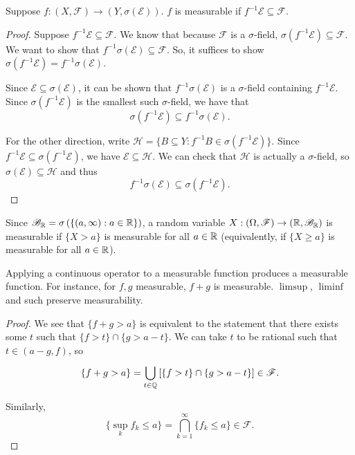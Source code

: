 \begin{lemma}
	Suppose $f: (X, \mathscr{F}) \to (Y, \sigma(\mathscr{E}))$. $f$ is measurable if $f^{-1} \mathscr{E} \subseteq \mathscr{F}$.
\end{lemma}

\begin{proof}
	Suppose $f^{-1} \mathscr{E} \subseteq \mathscr{F}$. We know that because $\mathscr{F}$ is a $\sigma$-field, $\sigma\left( f^{-1}\mathscr{E} \right) \subseteq \mathscr{F}$. We want to show that $f^{-1} \sigma(\mathscr{E}) \subseteq \mathscr{F}$. So, it suffices to show $\sigma\left( f^{-1}\mathscr{E} \right) = f^{-1} \sigma(\mathscr{E})$.

	Since $\mathscr{E} \subseteq \sigma(\mathscr{E})$, it can be shown that $f^{-1} \sigma(\mathscr{E})$ is a $\sigma$-field containing $f^{-1} \mathscr{E}$. Since $\sigma\left( f^{-1}\mathscr{E} \right)$ is the smallest such $\sigma$-field, we have that \[
		\sigma \left( f^{-1} \mathscr{E} \right) \subseteq f^{-1} \sigma\left( \mathscr{E} \right)
	.\] 

	For the other direction, write $\mathscr{H} = \{B \subseteq Y: f^{-1}B \in \sigma\left( f^{-1}\mathscr{E} \right)\}$.
	Since $f^{-1} \mathscr{E} \subseteq \sigma(f^{-1} \mathscr{E})$, we have $\mathscr{E} \subseteq \mathscr{H}$. We can check that $\mathscr{H}$ is actually a $\sigma$-field, so $		\sigma(\mathscr{E}) \subseteq \mathscr{H}$ and thus \[
		f^{-1} \sigma(\mathscr{E}) \subseteq \sigma \left( f^{-1} \mathscr{E} \right)
	.\]
\end{proof}

Since $\mathscr{B}_{\mathbb{R}} = \sigma\left( \{\left( a,\infty \right): a \in \mathbb{R}\} \right)$, a random variable $X: (\Omega, \mathscr{F}) \to \left( \mathbb{R}, \mathscr{B}_{\mathbb{R}} \right)$ is measurable if $\{X > a\}$ is measurable for all $a \in \mathbb{R}$ (equivalently, if $\{X \ge a\}$ is measurable for all $a \in \mathbb{R}$).

\begin{proposition}
	Applying a continuous operator to a measurable function produces a measurable function. For instance, for $f,g$ measurable, $f+g$ is measurable.
	$\limsup$, $\liminf$ and such preserve measurability.
\end{proposition}

\begin{proof}
	We see that $\{f+g > a\}$ is equivalent to the statement that there exists some $t$ such that $\{f > t\} \cap \{g > a-t\}$. We can take $t$ to be rational such that $t \in (a-g,f)$, so \[
		\{f+g > a\} = \bigcup\limits_{t \in \mathbb{Q}}^{} \left[ \{f > t\}\cap \{g > a-t\} \right] \in \mathscr{F}
	.\] 

	Similarly, \[
		\{\sup_k f_k \le a\} = \bigcap\limits_{k=1}^{\infty} \{f_k \le a\} \in \mathscr{F}
	.\] 
\end{proof}

